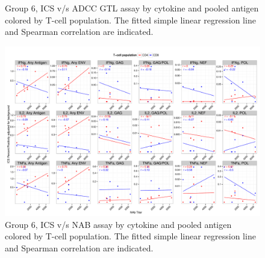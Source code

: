 \documentclass[11pt]{article}\usepackage[]{graphicx}\usepackage[]{color}
\makeatletter
\def\maxwidth{ %
  \ifdim\Gin@nat@width>\linewidth
    \linewidth
  \else
    \Gin@nat@width
  \fi
}
\newenvironment{knitrout}{}{} %
\makeatother
\begin{document}
\begin{landscape}
\begin{figure}[H]
\begin{center}
\begin{knitrout}
\end{knitrout}
\caption{Group 6, ICS v/s ADCC GTL assay by cytokine and pooled antigen colored by T-cell population. The fitted simple linear regression line and Spearman correlation are indicated.}
\end{center}
\end{figure}


\begin{figure}[H]
\begin{center}
\begin{knitrout}
\color{fgcolor}
\includegraphics[width=\maxwidth]{figure/corrplot_Grp6_NAb_pooledAntigen-1} 

\end{knitrout}
\caption{Group 6, ICS v/s NAB assay by cytokine and pooled antigen colored by T-cell population. The fitted simple linear regression line and Spearman correlation are indicated.}
\end{center}
\end{figure}



\end{landscape}
\end{document}

